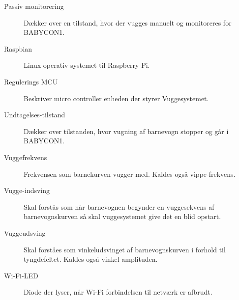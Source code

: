 \begin{description}
\item[Passiv monitorering] Dækker over en tilstand, hvor der vugges manuelt og monitoreres for BABYCON1.
\item[Raspbian] Linux operativ systemet til Raspberry Pi. 
\item[Regulerings MCU] Beskriver micro controller enheden der styrer Vuggesystemet.
\item[Undtagelses-tilstand] Dækker over tilstanden, hvor vugning af barnevogn stopper og går i BABYCON1.
\item[Vuggefrekvens] Frekvensen som barnekurven vugger med. Kaldes også vippe-frekvens.
\item[Vugge-indsving] Skal forstås som når barnevognen begynder en vuggesekvens af barnevognskurven så skal vuggesystemet give det en blid opstart.
\item[Vuggeudsving] Skal forståes som vinkeludsvinget af barnevognskurven i forhold til tyngdefeltet. Kaldes også vinkel-amplituden.
\item[Wi-Fi-LED]Diode der lyser, når Wi-Fi forbindelsen til netværk er afbrudt.

\end{description}